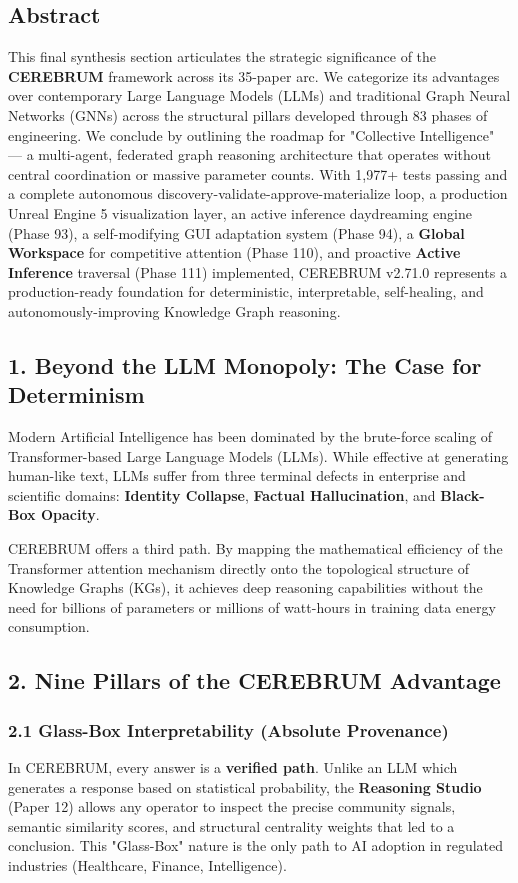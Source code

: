 
\subsection*{Abstract}
This final synthesis section articulates the strategic significance of the \textbf{CEREBRUM} framework across its 35-paper arc. We categorize its advantages over contemporary Large Language Models (LLMs) and traditional Graph Neural Networks (GNNs) across the structural pillars developed through 83 phases of engineering. We conclude by outlining the roadmap for "Collective Intelligence" --- a multi-agent, federated graph reasoning architecture that operates without central coordination or massive parameter counts. With 1,977+ tests passing and a complete autonomous discovery-validate-approve-materialize loop, a production Unreal Engine 5 visualization layer, an active inference daydreaming engine (Phase 93), a self-modifying GUI adaptation system (Phase 94), a \textbf{Global Workspace} for competitive attention (Phase 110), and proactive \textbf{Active Inference} traversal (Phase 111) implemented, CEREBRUM v2.71.0 represents a production-ready foundation for deterministic, interpretable, self-healing, and autonomously-improving Knowledge Graph reasoning.

\subsection*{1. Beyond the LLM Monopoly: The Case for Determinism}
Modern Artificial Intelligence has been dominated by the brute-force scaling of Transformer-based Large Language Models (LLMs). While effective at generating human-like text, LLMs suffer from three terminal defects in enterprise and scientific domains: \textbf{Identity Collapse}, \textbf{Factual Hallucination}, and \textbf{Black-Box Opacity}.

CEREBRUM offers a third path. By mapping the mathematical efficiency of the Transformer attention mechanism directly onto the topological structure of Knowledge Graphs (KGs), it achieves deep reasoning capabilities without the need for billions of parameters or millions of watt-hours in training data energy consumption.

\subsection*{2. Nine Pillars of the CEREBRUM Advantage}

\subsubsection*{2.1 Glass-Box Interpretability (Absolute Provenance)}
In CEREBRUM, every answer is a \textbf{verified path}. Unlike an LLM which generates a response based on statistical probability, the \textbf{Reasoning Studio} (Paper 12) allows any operator to inspect the precise community signals, semantic similarity scores, and structural centrality weights that led to a conclusion. This "Glass-Box" nature is the only path to AI adoption in regulated industries (Healthcare, Finance, Intelligence).

